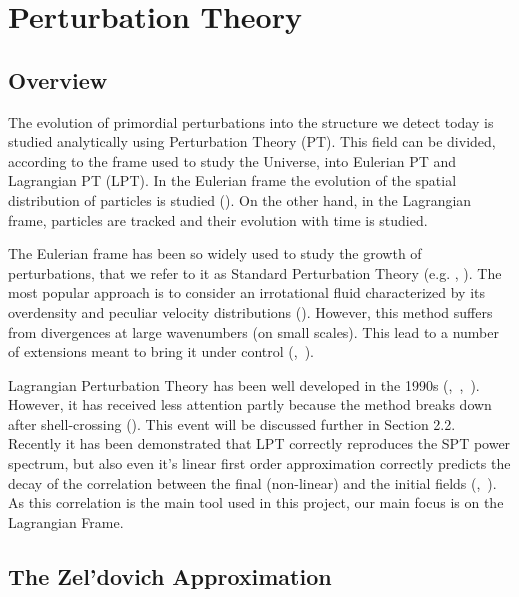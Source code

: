 

\section{Perturbation Theory}

\subsection{Overview}

The evolution of primordial perturbations into the structure we detect today is studied analytically using Perturbation Theory (PT). This field can be divided, according to the frame used to study the Universe, into Eulerian PT and Lagrangian PT (LPT). In the Eulerian frame the evolution of the spatial distribution of particles is studied (\cite{Bernardeau_PT}). On the other hand, in the Lagrangian frame, particles are tracked and their evolution with time is studied.

The Eulerian frame has been so widely used to study the growth of perturbations, that we refer to it as Standard Perturbation Theory (e.g. \cite{1983MNRAS.203..345V}, \cite{peebles1980large}). The most popular approach is to consider an irrotational fluid characterized by its overdensity and peculiar velocity distributions (\cite{Carlson_perturbation_theory}). However, this method suffers from divergences at large wavenumbers (on small scales). This lead to a number of extensions meant to bring it under control (\cite{2006PhRvD..73f3519C},~\cite{2008PhRvD..77b3533C}). 

Lagrangian Perturbation Theory has been well developed in the 1990s (\cite{1992MNRAS.254..729B},~\cite{1993MNRAS.264..375B},~\cite{1994MNRAS.267..811B}). However, it has received less attention partly because the method breaks down after shell-crossing (\cite{Carlson_perturbation_theory}). This event will be discussed further in Section 2.2. Recently it has been demonstrated that LPT correctly reproduces the SPT power spectrum, but also even it's linear first order approximation correctly predicts the decay of the correlation between the final (non-linear) and the initial fields (\cite{2008PhRvD..77f3530M},~\cite{2008PhRvD..78h3519M}). As this correlation is the main tool used in this project, our main focus is on the Lagrangian Frame. 

\subsection{The Zel'dovich Approximation}

